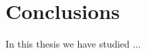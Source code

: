 \documentclass[class=report, crop=false]{standalone}
\begin{document}
\chapter{Conclusions}

In this thesis we have studied ...
\end{document}
